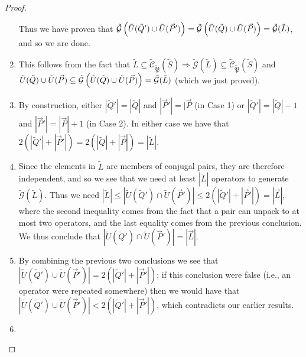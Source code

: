 \documentclass[twocolumn,showpacs,preprintnumbers,amsmath,amssymb,nofootinbib,pra,floatfix]{revtex4-1}
\newcommand{\lst}{\vec}
\newcommand{\set}{\tilde}
\newcommand{\genfun}{\tilde{\mathcal{G}}}
\newcommand{\pauligroup}{{\set{\mathfrak{P}}}}
\newcommand{\centralizer}{\set{\mathcal{C}}}
\begin{document}
\begin{proof}
\begin{enumerate}
Thus we have proven that $\genfun\paren{\set U(\set Q')\cup\set U(\lst P')}=\genfun\paren{\set U(\set Q)\cup\set U(\lst P)}=\genfun(\set L)$, and so we are done.
\item

This follows from the fact that $\set L\subseteq\centralizer_\pauligroup(\set S)\Rightarrow\genfun(\set L)\subseteq\centralizer_\pauligroup(\set S)$ and $\set U(\set Q)\cup\set U(\lst P)\subseteq\genfun\paren{\set U(\set Q)\cup\set U(\lst P)}=\genfun(\set L)$ (which we just proved).
\item

By construction, either $|\set Q'|=|\set Q|$ and $|\lst P'|=|\lst P$ (in Case 1) or $|\set Q'|=|\set Q|-1$ and $|\lst P'|=|\lst P|+1$ (in Case 2).  In either case we have that $2(|\set Q'|+|\lst P'|)=2(|\set Q|+|\lst P|)=|\set L|$.
\item

Since the elements in $\set L$ are members of conjugal pairs, they are therefore independent, and so we see that we need at least $|\set L|$ operators to generate $\genfun(\set L)$.  Thus we need $|\set L|\le|\set U(\set Q')\cap\set U(\lst P')|\le 2(|\set Q'|+|\lst P'|)=|\lst L|$,  where the second inequality comes from the fact that a pair can unpack to at most two operators, and the last equality comes from the previous conclusion.  We thus conclude that $|\set U(\set Q')\cap\set U(\lst P')|=|\lst L|$.
\item

By combining the previous two conclusions we see that $|\set U(\set Q')\cup\set U(\lst P')|=2(|\set Q'|+|\lst P'|)$;  if this conclusion were false (i.e., an operator were repeated somewhere) then we would have that $|\set U(\set Q')\cup\set U(\lst P')|<2(|\set Q'|+|\lst P'|)$, which contradicts our earlier results.
\item


\end{enumerate}
\end{proof}
\end{document}
